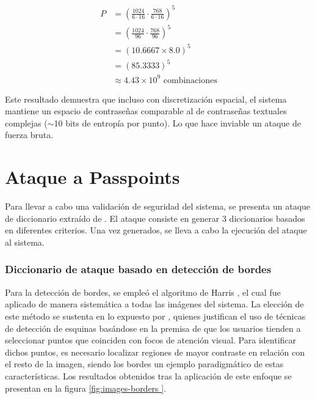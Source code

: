 \begin{align*}
	P &= \left( \frac{1024}{6 \cdot 16} \cdot \frac{768}{6 \cdot 16} \right)^5 \\
	&= \left( \frac{1024}{96} \cdot \frac{768}{96} \right)^5 \\
	&= (10.6667 \times 8.0)^5 \\
	&= (85.3333)^5 \\
	&\approx 4.43 \times 10^9 \text{ combinaciones}
\end{align*}

Este resultado demuestra que incluso con discretización espacial, el sistema mantiene un espacio de contraseñas comparable al de contraseñas textuales complejas ($\sim$10 bits de entropía por punto). Lo que hace inviable un ataque de fuerza bruta.


\section{Ataque a Passpoints}
Para llevar a cabo una validaci\'on de seguridad del sistema, se presenta un ataque de diccionario extra\'ido de \cite{van2010purely}. El ataque consiste en generar 3 diccionarios basados en diferentes criterios. Una vez generados, se lleva a cabo la ejecuci\'on del ataque al sistema.

\subsubsection{Diccionario de ataque basado en detecci\'on de bordes}
Para la detección de bordes, se empleó el algoritmo de Harris \cite{Harris1988ACC}, el cual fue aplicado de manera sistemática a todas las imágenes del sistema. La elección de este método se sustenta en lo expuesto por \cite{van2010purely}, quienes justifican el uso de técnicas de detección de esquinas basándose en la premisa de que los usuarios tienden a seleccionar puntos que coinciden con focos de atención visual. Para identificar dichos puntos, es necesario localizar regiones de mayor contraste en relación con el resto de la imagen, siendo los bordes un ejemplo paradigmático de estas características. Los resultados obtenidos tras la aplicación de este enfoque se presentan en la figura \ref{fig:images-borders }.

